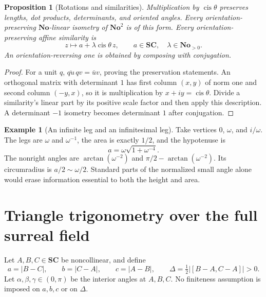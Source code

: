 \documentclass[11pt,letterpaper]{article}
\newtheorem{proposition}[theorem]{Proposition}
\theoremstyle{definition}
\newtheorem{example}[theorem]{Example}
\theoremstyle{remark}
\newcommand{\No}{\mathbf{No}}
\newcommand{\SC}{\mathbf{SC}}
\newcommand{\cis}{\operatorname{cis}}
\numberwithin{equation}{section}
\begin{document}
\begin{proposition}[Rotations and similarities]\label{prop:rotations}
Multiplication by $\cis\theta$ preserves lengths, dot products, determinants, and oriented angles. Every orientation-preserving $\No$-linear isometry of $\No^2$ is of this form. Every orientation-preserving affine similarity is
\[
 z\longmapsto a+\lambda\cis\theta\,z,\qquad a\in\SC,\quad\lambda\in\No_{>0}.
\]
An orientation-reversing one is obtained by composing with conjugation.
\end{proposition}
\begin{proof}
For a unit $q$, $\overline{qu}\,qv=\bar u v$, proving the preservation statements. An orthogonal matrix with determinant $1$ has first column $(x,y)$ of norm one and second column $(-y,x)$, so it is multiplication by $x+iy=\cis\theta$. Divide a similarity's linear part by its positive scale factor and then apply this description. A determinant $-1$ isometry becomes determinant $1$ after conjugation.
\end{proof}

\begin{example}[An infinite leg and an infinitesimal leg]\label{ex:thinright}
Take vertices $0$, $\omega$, and $i/\omega$. The legs are $\omega$ and $\omega^{-1}$, the area is exactly $1/2$, and the hypotenuse is
\[
 a=\omega\sqrt{1+\omega^{-4}}.
\]
The nonright angles are $\arctan(\omega^{-2})$ and $\pi/2-\arctan(\omega^{-2})$. Its circumradius is $a/2\sim\omega/2$. Standard parts of the normalized small angle alone would erase information essential to both the height and area.
\end{example}

\section{Triangle trigonometry over the full surreal field}\label{sec:triangles}
Let $A,B,C\in\SC$ be noncollinear, and define
\[
 a=|B-C|,\qquad b=|C-A|,\qquad c=|A-B|,\qquad
 \Delta=\tfrac12|[B-A,C-A]|>0.
\]
Let $\alpha,\beta,\gamma\in(0,\pi)$ be the interior angles at $A,B,C$. No finiteness assumption is imposed on $a,b,c$ or on $\Delta$.
\end{document}
